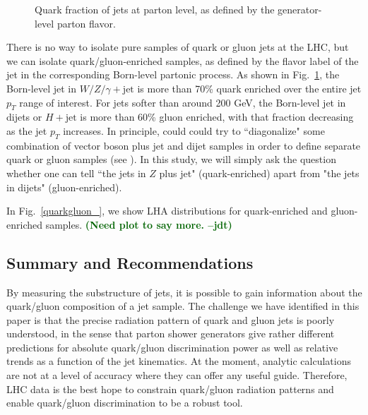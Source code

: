 \documentclass[11pt]{cernrep}
\newcommand{\jdt}[1]{\textbf{\textcolor{darkgreen}{(#1 --jdt)}}}
\begin{document}
\begin{figure}
\centering
{}
\caption{Quark fraction of jets at parton level, as defined by the generator-level parton flavor.}
\label{quarkgluon_fig:parton_level_qg_composition}
\end{figure}

There is no way to isolate pure samples of quark or gluon jets at the LHC, but we can isolate quark/gluon-enriched samples, as defined by the flavor label of the jet in the corresponding Born-level partonic process.  As shown in Fig.~\ref{quarkgluon_fig:parton_level_qg_composition}, the Born-level jet in $W/Z/\gamma + \text{jet}$ is more than 70\% quark enriched over the entire jet $p_T$ range of interest.  For jets softer than around 200 GeV, the Born-level jet in dijets or $H+\text{jet}$ is more than 60\% gluon enriched, with that fraction decreasing as the jet $p_T$ increases.  In principle, could could try to ``diagonalize" some combination of vector boson plus jet and dijet samples in order to define separate quark or gluon samples (see \cite{}).  In this study, we will simply ask the question whether one can tell ``the jets in $Z$ plus jet" (quark-enriched) apart from "the jets in dijets" (gluon-enriched).  

In Fig.~\ref{quarkgluon_}, we show LHA distributions for quark-enriched and gluon-enriched samples.  \jdt{Need plot to say more.}

\subsection{Summary and Recommendations}
\label{quarkgluon_sec:conclude}

By measuring the substructure of jets, it is possible to gain information about the quark/gluon composition of a jet sample.  The challenge we have identified in this paper is that the precise radiation pattern of quark and gluon jets is poorly understood, in the sense that parton shower generators give rather different predictions for absolute quark/gluon discrimination power as well as relative trends as a function of the jet kinematics.  At the moment, analytic calculations are not at a level of accuracy where they can offer any useful guide.  Therefore, LHC data is the best hope to constrain quark/gluon radiation patterns and enable quark/gluon discrimination to be a robust tool.
\end{document}
